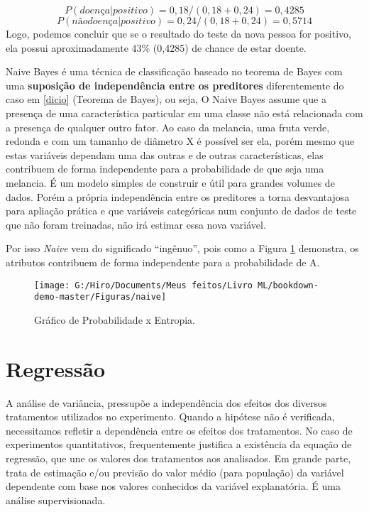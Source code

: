 \documentclass[
]{book}
\begin{document}
\[P(doença|positivo) = 0,18/(0,18+0,24) = 0,4285\]
\[P(não doença|positivo) = 0,24/(0,18+0,24) = 0,5714\]
Logo, podemos concluir que se o resultado do teste da nova pessoa for positivo, ela possui aproximadamente 43\% (0,4285) de chance de estar doente.

Naive Bayes é uma técnica de classificação baseado no teorema de Bayes com uma \textbf{suposição de independência entre os preditores} diferentemente do caso em \ref{dicio} (Teorema de Bayes), ou seja, O Naive Bayes assume que a presença de uma característica particular em uma classe não está relacionada com a presença de qualquer outro fator. Ao caso da melancia, uma fruta verde, redonda e com um tamanho de diâmetro X é possível ser ela, porém mesmo que estas variáveis dependam uma das outras e de outras características, elas contribuem de forma independente para a probabilidade de que seja uma melancia. É um modelo simples de construir e útil para grandes volumes de dados. Porém a própria independência entre os preditores a torna desvantajosa para apliação prática e que variáveis categóricas num conjunto de dados de teste que não foram treinadas, não irá estimar essa nova variável.

Por isso \emph{Naive} vem do significado ``ingênuo'', pois como a Figura \ref{fig:naive} demonstra, os atributos contribuem de forma independente para a probabilidade de A.

\begin{figure}

{\centering \texttt{[image: G:/Hiro/Documents/Meus feitos/Livro ML/bookdown-demo-master/Figuras/naive]} 

}

\caption{Gráfico de Probabilidade x Entropia.}\label{fig:naive}
\end{figure}



\hypertarget{reg}{%
\section{Regressão}\label{reg}}

A análise de variância, pressupõe a independência dos efeitos dos diversos tratamentos utilizados no experimento. Quando a hipótese não é verificada, necessitamos refletir a dependência entre os efeitos dos tratamentos. No caso de experimentos quantitativos, frequentemente justifica a existência da equação de regressão, que une os valores dos tratamentos aos analisados. Em grande parte, trata de estimação e/ou previsão do valor médio (para população) da variável dependente com base nos valores conhecidos da variável explanatória. É uma análise supervisionada.
\end{document}
